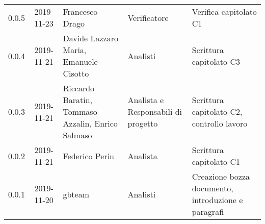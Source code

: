 {\begin{longtable}{ c c  C{4cm}  C{3cm} C{4cm}}
0.0.5 & 2019-11-23 & Francesco Drago & Verificatore & Verifica capitolato C1 \\

0.0.4 & 2019-11-21 & Davide Lazzaro Maria, Emanuele Cisotto & Analisti & Scrittura capitolato C3 \\

0.0.3 & 2019-11-21 & Riccardo Baratin, Tommaso Azzalin, Enrico Salmaso & Analista e Responsabili di progetto & Scrittura capitolato C2, controllo lavoro  \\
0.0.2 & 2019-11-21 & Federico Perin & Analista & Scrittura capitolato C1  \\
		
0.0.1 & 2019-11-20 & gbteam & Analisti & Creazione bozza documento, introduzione e paragrafi \\
		
\end{longtable}
}